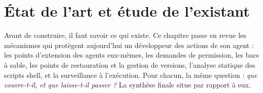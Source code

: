 \chapter{État de l'art et étude de l'existant}
\label{ch:etat-art}

Avant de construire, il faut savoir ce qui existe. Ce chapitre passe en revue les
mécanismes qui protègent aujourd'hui un développeur des actions de son agent : les points
d'extension des agents eux-mêmes, les demandes de permission, les bacs à sable, les points
de restauration et la gestion de versions, l'analyse statique des scripts shell, et la
surveillance à l'exécution. Pour chacun, la même question : \emph{que couvre-t-il, et que
laisse-t-il passer ?} La synthèse finale situe \demo{} par rapport à eux.








